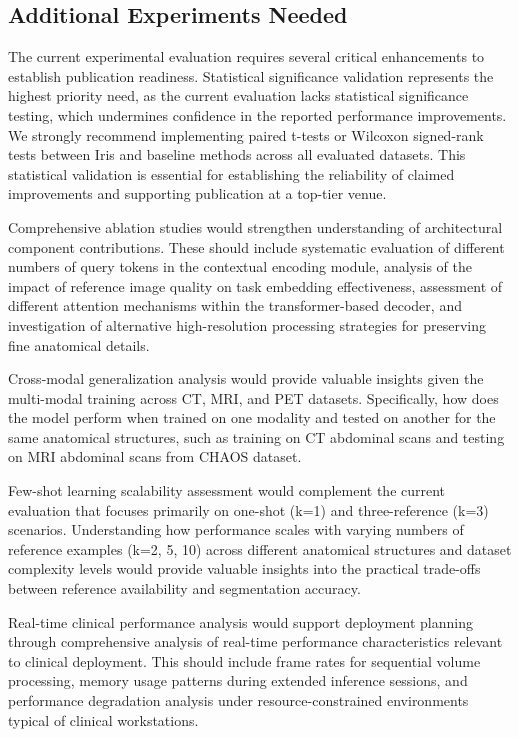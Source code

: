 \subsection{Additional Experiments Needed}
The current experimental evaluation requires several critical enhancements to establish publication readiness. Statistical significance validation represents the highest priority need, as the current evaluation lacks statistical significance testing, which undermines confidence in the reported performance improvements. We strongly recommend implementing paired t-tests or Wilcoxon signed-rank tests between Iris and baseline methods across all evaluated datasets. This statistical validation is essential for establishing the reliability of claimed improvements and supporting publication at a top-tier venue.

Comprehensive ablation studies would strengthen understanding of architectural component contributions. These should include systematic evaluation of different numbers of query tokens in the contextual encoding module, analysis of the impact of reference image quality on task embedding effectiveness, assessment of different attention mechanisms within the transformer-based decoder, and investigation of alternative high-resolution processing strategies for preserving fine anatomical details.

Cross-modal generalization analysis would provide valuable insights given the multi-modal training across CT, MRI, and PET datasets. Specifically, how does the model perform when trained on one modality and tested on another for the same anatomical structures, such as training on CT abdominal scans and testing on MRI abdominal scans from CHAOS dataset.

Few-shot learning scalability assessment would complement the current evaluation that focuses primarily on one-shot (k=1) and three-reference (k=3) scenarios. Understanding how performance scales with varying numbers of reference examples (k=2, 5, 10) across different anatomical structures and dataset complexity levels would provide valuable insights into the practical trade-offs between reference availability and segmentation accuracy.

Real-time clinical performance analysis would support deployment planning through comprehensive analysis of real-time performance characteristics relevant to clinical deployment. This should include frame rates for sequential volume processing, memory usage patterns during extended inference sessions, and performance degradation analysis under resource-constrained environments typical of clinical workstations.

